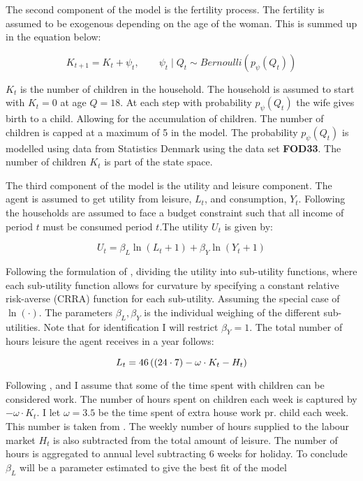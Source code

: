 The second component of the model is the fertility process. The fertility is assumed to be exogenous depending on the age of the woman. This is summed up in the equation below:

\begin{equation}
    K_{t+1} = K_t+ \psi_t, \qquad \psi_t \mid Q_t \sim Bernoulli (p_\psi(Q_t))
\end{equation}

$K_t$ is the number of children in the household. The household is assumed to start with $K_t = 0$ at age $Q=18$. At each step with probability $p_\psi(Q_t)$ the wife gives birth to a child. Allowing for the accumulation of children. The number of children is capped at a maximum of 5 in the model. The probability $p_\psi(Q_t)$ is modelled using data from Statistics Denmark using the data set \textbf{FOD33}. The number of children $K_t$ is part of the state space. 

The third component of the model is the utility and leisure component. The agent is assumed to get utility from leisure, $L_t$, and consumption, $Y_t$. Following \textcite{francesconi_joint_2002} the households are assumed to face a budget constraint such that all income of period $t$ must be consumed period $t$.The utility $U_t$ is given by:

\begin{equation}
    U_t = \beta_L \ln(L_t + 1) + \beta_Y \ln(Y_t + 1)
\end{equation}

Following the formulation of \textcite{adda_career_2011}, dividing the utility into sub-utility functions, where each sub-utility function allows for curvature by specifying a constant relative risk-averse (CRRA) function for each sub-utility. Assuming the special case of $\ln(\cdot)$. The parameters $\beta_L, \beta_Y$ is the individual weighing of the different sub-utilities. Note that for identification I will restrict $\beta_Y= 1$. The total number of hours leisure the agent receives in a year follows: 

\begin{equation}
    L_t = 46 \left( \left( 24 \cdot 7 \right) - \omega \cdot K_t - H_t \right)
\end{equation}

Following \textcite{firestone_estimation_1988}, \textcite{thrane_men_2000} and \textcite{ekert-jaffe_time_2015} I assume that some of the time spent with children can be considered work. The number of hours spent on children each week is captured by $-\omega \cdot K_t$. I let $\omega=3.5$ be the time spent of extra house work pr. child each week. This number is taken from \textcite{ekert-jaffe_time_2015}. The weekly number of hours supplied to the labour market $H_t$ is also subtracted from the total amount of leisure. The number of hours is aggregated to annual level subtracting 6 weeks for holiday. To conclude $\beta_L$ will be a parameter estimated to give the best fit of the model

